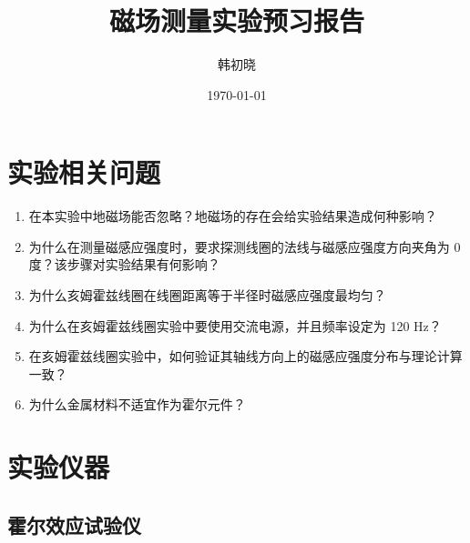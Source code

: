 \documentclass[a4paper,10pt]{article}
\begin{document}
\title{磁场测量实验预习报告} %
\author{韩初晓} %
\date{\today} %
\maketitle %

\newpage

\section{实验相关问题}
\begin{enumerate}
  \item 在本实验中地磁场能否忽略？地磁场的存在会给实验结果造成何种影响？
  \item 为什么在测量磁感应强度时，要求探测线圈的法线与磁感应强度方向夹角为 0 度？该步骤对实验结果有何影响？
  \item 为什么亥姆霍兹线圈在线圈距离等于半径时磁感应强度最均匀？
  \item 为什么在亥姆霍兹线圈实验中要使用交流电源，并且频率设定为 120 Hz？
  \item 在亥姆霍兹线圈实验中，如何验证其轴线方向上的磁感应强度分布与理论计算一致？
  \item 为什么金属材料不适宜作为霍尔元件？
\end{enumerate}

\section{实验仪器}

\subsection{霍尔效应试验仪}
\end{document}
